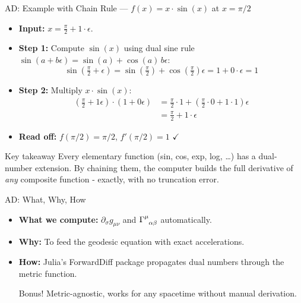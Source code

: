 \documentclass[10pt, aspectratio=169]{beamer}
\begin{document}
	\begin{frame}{AD: Example with Chain Rule --- $f(x) = x \cdot \sin(x)$ at $x=\pi/2$}
		\begin{itemize}
			\item \textbf{Input:} $x = \frac{\pi}{2} + 1\cdot\epsilon$.
			\item \textbf{Step 1:} Compute $\sin(x)$ using dual sine rule $\sin(a+b\epsilon) = \sin(a) + \cos(a)\,b\epsilon$:
			\begin{equation}
				\sin\!\left(\tfrac{\pi}{2} + \epsilon\right) = \sin\!\left(\tfrac{\pi}{2}\right) + \cos\!\left(\tfrac{\pi}{2}\right)\epsilon = 1 + 0\cdot\epsilon = 1
			\end{equation}
			\item \textbf{Step 2:} Multiply $x \cdot \sin(x)$:
			\begin{align*}
				\left(\tfrac{\pi}{2} + 1\epsilon\right) \cdot \left(1 + 0\epsilon\right) &= \tfrac{\pi}{2}\cdot 1 + \left(\tfrac{\pi}{2}\cdot 0 + 1\cdot 1\right)\epsilon \\
				&= \tfrac{\pi}{2} + 1\cdot\epsilon
			\end{align*}
			\item \textbf{Read off:} $f(\pi/2) = \pi/2$, \quad $f'(\pi/2) = 1$ \quad $\checkmark$
		\end{itemize}
		\vspace{0.2cm}
		\begin{block}{Key takeaway}
			Every elementary function (sin, cos, exp, log, \dots) has a dual-number extension. By chaining them, the computer builds the full derivative of \emph{any} composite function - exactly, with no truncation error.
		\end{block}
	\end{frame}
	
	\begin{frame}{AD: What, Why, How}
		\begin{itemize}
			\item \textbf{What we compute:} $\partial_\sigma g_{\mu\nu}$ and $\tensor{\Gamma}{^\mu_{\alpha\beta}}$ automatically.
			\item \textbf{Why:} To feed the geodesic equation with exact accelerations.
			\item \textbf{How:} Julia's ForwardDiff package propagates dual numbers through the metric function.
			\vspace{0.3cm}
			\begin{center}
				\begin{minipage}{0.7\textwidth}
					\begin{block}{Bonus!}
						\small Metric-agnostic, works for any spacetime without manual derivation.
					\end{block}
				\end{minipage}
			\end{center}
		\end{itemize}
	\end{frame}
	
\end{document}
